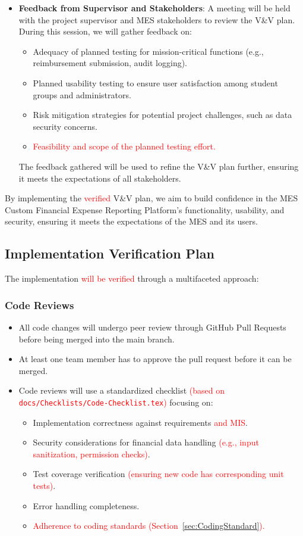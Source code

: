 \documentclass[12pt, titlepage]{article}
\begin{document}
\begin{itemize}
    \item \textbf{Feedback from Supervisor and Stakeholders}: A meeting will be held with the project supervisor and MES stakeholders to review the V\&V plan. During this session, we will gather feedback on:
    \begin{itemize}
        \item Adequacy of planned testing for mission-critical functions (e.g., reimbursement submission, audit logging).
        \item Planned usability testing to ensure user satisfaction among student groups and administrators.
        \item Risk mitigation strategies for potential project challenges, such as data security concerns.
        \item \textcolor{red}{Feasibility and scope of the planned testing effort.}
    \end{itemize}
    The feedback gathered will be used to refine the V\&V plan further, ensuring it meets the expectations of all stakeholders.
\end{itemize}

By implementing the \textcolor{red}{verified} V\&V plan, we aim to build confidence in the MES Custom Financial Expense Reporting Platform’s functionality, usability, and security, ensuring it meets the expectations of the MES and its users.

\subsection{Implementation Verification Plan}
The implementation \textcolor{red}{will be verified} through a multifaceted approach:

\subsubsection*{Code Reviews}
\begin{itemize}
  \item All code changes will undergo peer review through GitHub Pull Requests before being merged into the main branch.
  \item At least one team member has to approve the pull request before it can be merged.
  \item Code reviews will use a standardized checklist \textcolor{red}{(based on \texttt{docs/Checklists/Code-Checklist.tex})} focusing on:
  \begin{itemize}
    \item Implementation correctness against requirements \textcolor{red}{and MIS}.
    \item Security considerations for financial data handling \textcolor{red}{(e.g., input sanitization, permission checks)}.
    \item Test coverage verification \textcolor{red}{(ensuring new code has corresponding unit tests)}.
    \item Error handling completeness.
    \item \textcolor{red}{Adherence to coding standards (Section~\ref{sec:CodingStandard}).} 
  \end{itemize}
\end{itemize}
\end{document}
